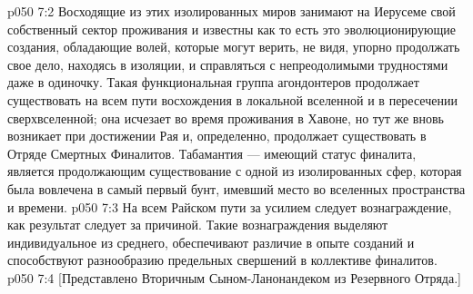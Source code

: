 \vs p050 7:2 Восходящие из этих изолированных миров занимают на Иерусеме свой собственный сектор проживания и известны как  то есть это эволюционирующие создания, обладающие волей, которые могут верить, не видя, упорно продолжать свое дело, находясь в изоляции, и справляться с непреодолимыми трудностями даже в одиночку. Такая функциональная группа агондонтеров продолжает существовать на всем пути восхождения в локальной вселенной и в пересечении сверхвселенной; она исчезает во время проживания в Хавоне, но тут же вновь возникает при достижении Рая и, определенно, продолжает существовать в Отряде Смертных Финалитов. Табамантия ---  имеющий статус финалита, является продолжающим существование с одной из изолированных сфер, которая была вовлечена в самый первый бунт, имевший место во вселенных пространства и времени.
\vs p050 7:3 На всем Райском пути за усилием следует вознаграждение, как результат следует за причиной. Такие вознаграждения выделяют индивидуальное из среднего, обеспечивают различие в опыте созданий и способствуют разнообразию предельных свершений в коллективе финалитов.
\vsetoff
\vs p050 7:4 [Представлено Вторичным Сыном\hyp{}Ланонандеком из Резервного Отряда.]
